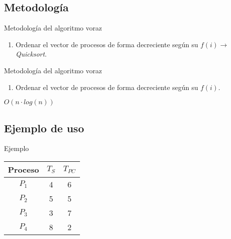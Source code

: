 \documentclass{beamer}
\begin{document}
\subsection{Metodología}
\begin{frame}[fragile]{Metodología del algoritmo voraz}
\begin{enumerate}
	\item Ordenar el vector de procesos de forma decreciente según su $f(i)\rightarrow $ \emph{Quicksort}.
\end{enumerate}
\end{frame}

\begin{frame}[fragile]{Metodología del algoritmo voraz}
\begin{enumerate}
	\item Ordenar el vector de procesos de forma decreciente según su $f(i)$.
\end{enumerate}
\vspace{2cm}
\Huge{$O(n\cdot log(n))$}
\end{frame}

\subsection{Ejemplo de uso}

\begin{frame}[fragile]{Ejemplo}
\begin{table}
\begin{tabular}{|c|c|c|}
\hline
\textbf{Proceso} & \textbf{$T_{S}$} & \textbf{$T_{PC}$} \\
\hline
$P_1$ & 4 & 6 \\
\hline
$P_2$ & 5 & 5 \\
\hline
$P_3$ & 3 & 7 \\
\hline
$P_4$ & 8 & 2 \\
\hline
\end{tabular}
\end{table}
\end{frame}
\end{document}
